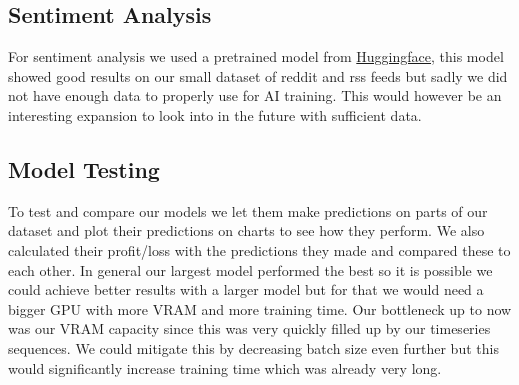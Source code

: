 \documentclass[12pt,a4paper]{article}
\begin{document}
\subsection{Sentiment Analysis}

For sentiment analysis we used a pretrained model from \href{https://huggingface.co/siebert/sentiment-roberta-large-english}{Huggingface}, this model showed good results on our small dataset of reddit and rss feeds but sadly we did not have enough data to properly use for AI training. This would however be an interesting expansion to look into in the future with sufficient data.

\subsection{Model Testing}

To test and compare our models we let them make predictions on parts of our dataset and plot their predictions on charts to see how they perform. We also calculated their profit/loss with the predictions they made and compared these to each other. In general our largest model performed the best so it is possible we could achieve better results with a larger model but for that we would need a bigger GPU with more VRAM and more training time. Our bottleneck up to now was our VRAM capacity since this was very quickly filled up by our timeseries sequences. We could mitigate this by decreasing batch size even further but this would significantly increase training time which was already very long.
\end{document}
